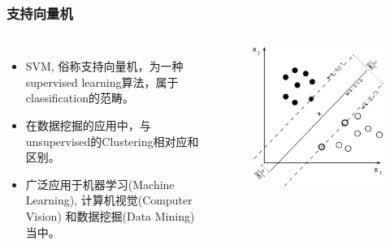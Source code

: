 \begin{frame} 
\frametitle{支持向量机}  
\begin{columns}

	\begin{itemize}
		\item SVM, 俗称支持向量机，为一种supervised learning算法，属于classification的范畴。
		\item 在数据挖掘的应用中，与unsupervised的Clustering相对应和区别。
		\item 广泛应用于机器学习(Machine Learning), 计算机视觉(Computer Vision) 和数据挖掘(Data Mining)当中。	
	\end{itemize}

	\begin{figure}[ht]
	\centering
	\includegraphics[width=\linewidth]{partition/img/svm_1.jpg}  
	\end{figure}


\end{columns}
\end{frame} 


